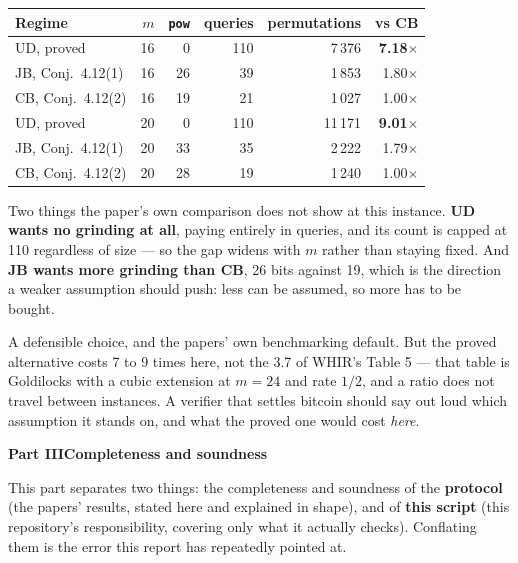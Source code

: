 \documentclass[11pt,a4paper]{article}
\begin{document}
\begin{center}\small
\begin{tabular}{@{}lrrrrr@{}}
\toprule
\textbf{Regime} & $m$ & \texttt{pow} & \textbf{queries} & \textbf{permutations} & \textbf{vs CB}\\
\midrule
UD, proved            & 16 & 0  & 110 & 7\,376  & \textbf{7.18$\times$}\\
JB, Conj.\ 4.12(1)    & 16 & 26 & 39  & 1\,853  & 1.80$\times$\\
CB, Conj.\ 4.12(2)    & 16 & 19 & 21  & 1\,027  & 1.00$\times$\\
\midrule
UD, proved            & 20 & 0  & 110 & 11\,171 & \textbf{9.01$\times$}\\
JB, Conj.\ 4.12(1)    & 20 & 33 & 35  & 2\,222  & 1.79$\times$\\
CB, Conj.\ 4.12(2)    & 20 & 28 & 19  & 1\,240  & 1.00$\times$\\
\bottomrule
\end{tabular}
\end{center}

Two things the paper's own comparison does not show at this instance. \textbf{UD wants no grinding at
all}, paying entirely in queries, and its count is capped at 110 regardless of size --- so the gap
widens with $m$ rather than staying fixed. And \textbf{JB wants more grinding than CB}, 26 bits
against 19, which is the direction a weaker assumption should push: less can be assumed, so more has
to be bought.

A defensible choice, and the papers' own benchmarking default. But the proved alternative costs 7 to
9 times here, not the 3.7 of WHIR's Table 5 --- that table is Goldilocks with a cubic extension at
$m=24$ and rate $1/2$, and a ratio does not travel between instances. A verifier that settles bitcoin
should say out loud which assumption it stands on, and what the proved one would cost \emph{here}.

\clearpage
\begin{center}{\large\bfseries Part III\quad Completeness and soundness}\end{center}
\vspace{-0.5em}
\noindent{\color{rule}\rule{\linewidth}{0.6pt}}

\medskip
This part separates two things: the completeness and soundness of the \textbf{protocol} (the papers'
results, stated here and explained in shape), and of \textbf{this script} (this repository's
responsibility, covering only what it actually checks). Conflating them is the error this report has
repeatedly pointed at.
\end{document}

